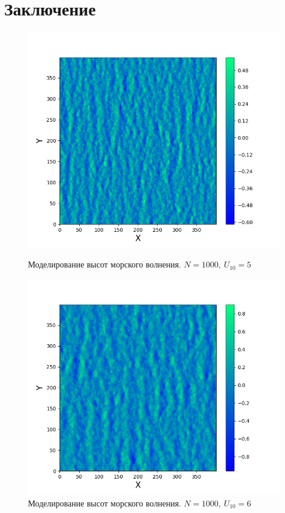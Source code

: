 \section{Заключение}
\begin{figure}[h!]
\begin{minipage}[h]{0.45\linewidth}
	\centering
	\includegraphics[width=\linewidth]{img/water5.png}
	\caption{Моделирование высот морского волнения. $N=1000, ~ U_{10}=5$ }
	\label{fig:water5}
\end{minipage}
\hfill
\begin{minipage}[h]{0.45\linewidth}
	\centering
	\includegraphics[width=\linewidth]{img/water6.png}
	\caption{Моделирование высот морского волнения. $N=1000, ~ U_{10}=6$ }
	\label{fig:water6}
\end{minipage}


\end{figure}
